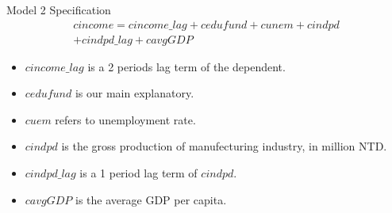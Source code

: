 \documentclass[compress]{beamer}
\begin{document}
\begin{frame}{Model 2 Specification}
  \begin{multline}
    cincome = cincome\_lag + cedufund + cunem + cindpd \\
    + cindpd\_lag + cavgGDP
  \end{multline}
  \begin{itemize}
    \item $cincome\_lag$ is a 2 periods lag term of the dependent.
    \item $cedufund$ is our main explanatory.
    \item $cuem$ refers to unemployment rate.
    \item $cindpd$ is the gross production of manufecturing industry, in million NTD.
    \item $cindpd\_lag$ is a 1 period lag term of $cindpd$.
    \item $cavgGDP$ is the average GDP per capita.
  \end{itemize}
\end{frame}
\end{document}
